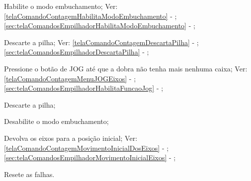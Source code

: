 \begin{procedureFixingIsuesSector2}

  \item[\ding{\dingNumber}] Habilite o modo embuchamento; Ver:
  \ifmachineType
  \ref{telaComandoContagemHabilitaModoEmbuchamento} - ;
  \else
  \ref{sec:telaComandosEmpilhadorHabilitaModoEmbuchamento} - ;
  \fi
  \item[\ding{\dingNumber}] Descarte a pilha; Ver:
  \ifmachineType
  \ref{telaComandoContagemDescartaPilha} - ;
  \else
  \ref{sec:telaComandosEmpilhadorDescartaPilha} - ;
  \fi
  \item[\ding{\dingNumber}] Pressione o botão de JOG até que a dobra não tenha mais nenhuma caixa; Ver:
  \ifmachineType
  \ref{telaComandoContagemMenuJOGEixos} - ;
  \else
  \ref{sec:telaComandosEmpilhadorHabilitaFuncaoJog} - ;
  \fi
  \item[\ding{\dingNumber}] Descarte a pilha;
  \item[\ding{\dingNumber}] Desabilite o modo embuchamento;
  \item[\ding{\dingNumber}] Devolva os eixos para a posição inicial; Ver:
  \ifmachineType
  \ref{telaComandoContagemMovimentoInicialDosEixos} - ;
  \else
  \ref{sec:telaComandosEmpilhadorMovimentoInicialEixos} - ;
  \fi
  \item[\ding{\dingNumber}] Resete as falhas.
  
\end{procedureFixingIsuesSector2}
  



